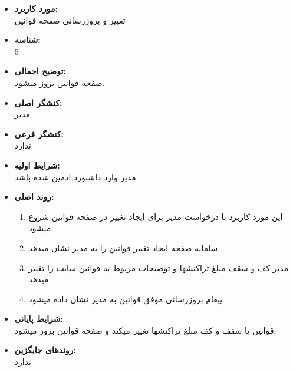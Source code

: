 \documentclass{article}
\begin{document}
\noindent\makebox[\linewidth]{\rule{\paperwidth}{0.4pt}}
\begin{itemize}
\item \textbf{مورد کاربرد:}\\
تغییر و بروزرسانی صفحه قوانین
\item \textbf{شناسه:}\\
5
\item \textbf{توضیح اجمالی:}\\
صفحه قوانین بروز میشود.
\item \textbf{کنشگر اصلی:}\\
مدیر
\item \textbf{کنشگر فرعی:}\\
ندارد
\item \textbf{شرایط اولیه:}\\
مدیر وارد داشبورد ادمین شده باشد.
\item \textbf{روند اصلی:}\\
\begin{enumerate}
\item  این مورد کاربرد با درخواست مدیر برای ایجاد تغییر در صفحه قوانین شروع میشود.
\item سامانه صفحه  ایجاد تغییر قوانین را به مدیر نشان میدهد.
\item مدیر کف و سقف مبلغ تراکنشها و توضیحات مربوط به قوانین سایت را تغییر میدهد.
\item پیغام بروزرسانی موفق قوانین به مدیر نشان داده میشود.
\end{enumerate}
\item \textbf{شرایط پایانی:}\\ 
قوانین یا سقف و کف مبلغ تراکنشها تغییر میکند و صفحه قوانین بروز میشود.
\item \textbf{روندهای جایگزین:}\\
ندارد
\end{itemize}

\noindent\makebox[\linewidth]{\rule{\paperwidth}{0.4pt}}
\end{document}
